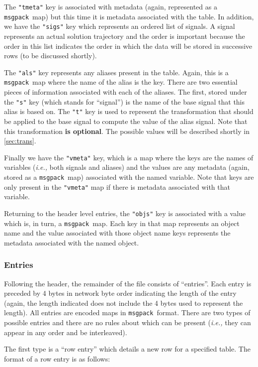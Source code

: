\documentclass[11pt,a4paper,twocolumn]{article}
\newcommand{\msgpack}{\texttt{msgpack}}
\newcommand{\code}[1]{\texttt{#1}} %
\begin{document}
The \code{"tmeta"} key is associated with metadata (again, represented
as a \msgpack\ map) but this time it is metadata associated with the
table.  In addition, we have the \code{"sigs"} key which represents an
ordered list of signals.  A signal represents an actual solution
trajectory and the order is important because the order in this list
indicates the order in which the data will be stored in successive
rows (to be discussed shortly).

The \code{"als"} key represents any aliases present in the table.
Again, this is a \msgpack\ map where the name of the alias is the key.
There are two essential pieces of information associated with each of
the aliases.  The first, stored under the \code{"s"} key (which stands
for ``signal'') is the name of the base signal that this alias is
based on.  The \code{"t"} key is used to represent the transformation
that should be applied to the base signal to compute the value of the
alias signal.  Note that this transformation \textbf{is optional}.
The possible values will be described shortly in \ref{sec:trans}.

Finally we have the \code{"vmeta"} key, which is a map where the keys
are the names of variables (\textit{i.e.,} both signals and aliases)
and the values are any metadata (again, stored as a \msgpack\ map)
associated with the named variable.  Note that keys are only present
in the \code{"vmeta"} map if there is metadata associated with that
variable.

Returning to the header level entries, the \code{"objs"} key is
associated with a value which is, in turn, a \msgpack\ map.  Each key
in that map represents an object name and the value associated with
those object name keys represents the metadata associated with the
named object.

\subsubsection{Entries}

Following the header, the remainder of the file consists of
``entries''.  Each entry is preceded by 4 bytes in network byte order
indicating the length of the entry (again, the length indicated does
not include the 4 bytes used to represent the length).  All entries
are encoded maps in \msgpack\ format.  There are two types of possible
entries and there are no rules about which can be present
(\textit{i.e.,} they can appear in any order and be interleaved).

The first type is a ``row entry'' which details a new row for a
specified table.  The format of a row entry is as follows:
\end{document}
